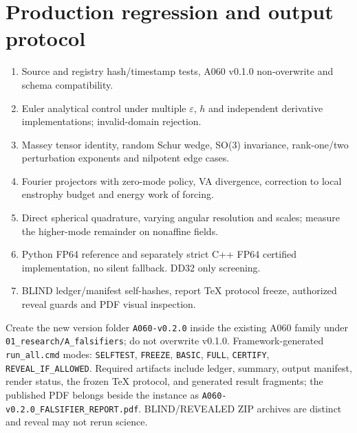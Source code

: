 \documentclass[10pt,a4paper]{article}
\newcommand{\code}[1]{\texttt{#1}}
\begin{document}
\section{Production regression and output protocol}
\begin{enumerate}[nosep,leftmargin=6mm]
\item Source and registry hash/timestamp tests, A060 v0.1.0 non-overwrite and schema compatibility.
\item Euler analytical control under multiple $\varepsilon$, $h$ and independent derivative implementations; invalid-domain rejection.
\item Massey tensor identity, random Schur wedge, SO(3) invariance, rank-one/two perturbation exponents and nilpotent edge cases.
\item Fourier projectors with zero-mode policy, VA divergence, correction to local enstrophy budget and energy work of forcing.
\item Direct spherical quadrature, varying angular resolution and scales; measure the higher-mode remainder on nonaffine fields.
\item Python FP64 reference and separately strict C++ FP64 certified implementation, no silent fallback. DD32 only screening.
\item BLIND ledger/manifest self-hashes, report TeX protocol freeze, authorized reveal guards and PDF visual inspection.
\end{enumerate}

Create the new version folder \code{A060-v0.2.0} inside the existing A060 family under \code{01\_research/A\_falsifiers}; do not overwrite v0.1.0. Framework-generated \code{run\_all.cmd} modes: \code{SELFTEST}, \code{FREEZE}, \code{BASIC}, \code{FULL}, \code{CERTIFY}, \code{REVEAL\_IF\_ALLOWED}. Required artifacts include ledger, summary, output manifest, render status, the frozen TeX protocol, and generated result fragments; the published PDF belongs beside the instance as \code{A060-v0.2.0\_FALSIFIER\_REPORT.pdf}. BLIND/REVEALED ZIP archives are distinct and reveal may not rerun science.
\end{document}
